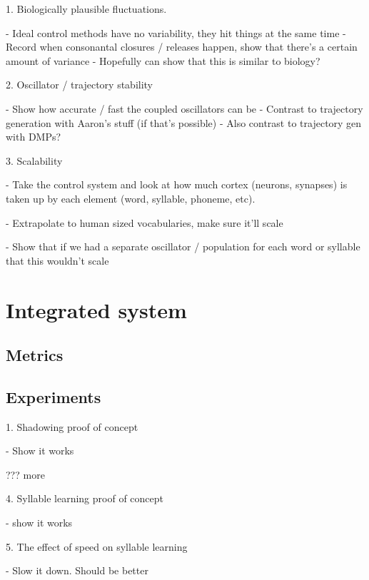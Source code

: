 1. Biologically plausible fluctuations.

- Ideal control methods have no variability, they hit things at the same time
- Record when consonantal closures / releases happen, show that there's
  a certain amount of variance
- Hopefully can show that this is similar to biology?

2. Oscillator / trajectory stability

- Show how accurate / fast the coupled oscillators can be
- Contrast to trajectory generation with Aaron's stuff
  (if that's possible)
  - Also contrast to trajectory gen with DMPs?

3. Scalability

- Take the control system and look at how much cortex (neurons, synapses)
  is taken up by each element (word, syllable, phoneme, etc).

- Extrapolate to human sized vocabularies, make sure it'll scale

- Show that if we had a separate oscillator / population
  for each word or syllable that this wouldn't scale

\section{Integrated system}

\subsection{Metrics}

\subsection{Experiments}

1. Shadowing proof of concept

- Show it works

??? more

4. Syllable learning proof of concept

- show it works

5. The effect of speed on syllable learning

- Slow it down. Should be better
